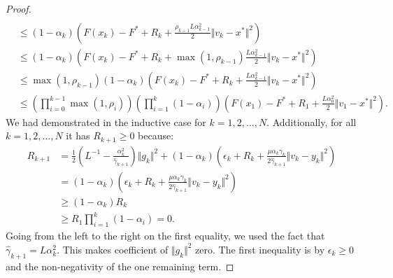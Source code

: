 \documentclass[12pt]{article}
\begin{document}
\begin{proof}
{\begin{align*}
            \\
            &\le 
            (1 - \alpha_k)
            \left(
                F(x_k) - F^* + R_k + \frac{\rho_{k - 1}L \alpha_{k - 1}^2}{2}\Vert v_k - x^*\Vert^2
            \right)
            \\
            &\le 
            (1 - \alpha_k)
            \left(
                F(x_k) - F^* + R_k + \max(1, \rho_{k - 1})\frac{L \alpha_{k - 1}^2}{2}\Vert v_k - x^*\Vert^2
            \right)
            \\
            &\le 
            \max(1, \rho_{k - 1})(1 - \alpha_k)
            \left(
                F(x_k) - F^* + R_k + \frac{L \alpha_{k - 1}^2}{2}\Vert v_k - x^*\Vert^2
            \right)
            \\
            &\le 
            \left(
                \prod_{i = 0}^{k - 1} \max(1, \rho_{i})
            \right)
            \left(
                \prod_{i = 1}^{k} \left(1  - \alpha_i\right)
            \right)
            \left(
                F(x_1) - F^* + R_1 + \frac{L\alpha_0^2}{2}\Vert v_1 - x^*\Vert^2
            \right). 
        \end{align*}
        }
        We had demonstrated in the inductive case for $k=1, 2, \ldots, N$. 
        Additionally, for all $k = 1, 2, \ldots, N$ it has $R_{k + 1} \ge 0$ because: 
        \begin{align*}
            R_{k + 1}
            &= 
            \frac{1}{2}\left(
                L^{-1} - \frac{\alpha_k^2}{\hat \gamma_{k + 1}}
            \right)\Vert g_k\Vert^2
            + 
            (1 - \alpha_k)
            \left(
                \epsilon_k + R_k + 
                \frac{\mu\alpha_k\gamma_k}{2\hat \gamma_{k + 1}}
                \Vert v_k - y_k\Vert^2
            \right)
            \\
            &= (1 - \alpha_k)
            \left(
                \epsilon_k + R_k 
                + \frac{\mu\alpha_k\gamma_k}{2\hat \gamma_{k + 1}}
                \Vert v_k - y_k\Vert^2
            \right)
            \\
            &\ge 
            (1 - \alpha_k) R_k
            \\
            &\ge R_1 \prod_{i = 1}^{k} \left(1 - \alpha_i\right) = 0. 
        \end{align*}
        Going from the left to the right on the first equality, we used the fact that $\hat \gamma_{k + 1} = L \alpha_{k}^2$.
        This makes coefficient of $\Vert g_k\Vert^2$ zero. 
        The first inequality is by $\epsilon_k \ge 0$ and the non-negativity of the one remaining term. 

\end{proof}
\end{document}
